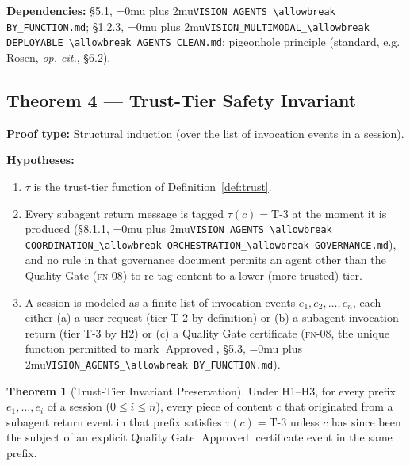 \documentclass[12pt]{article}
\theoremstyle{definition}
\newtheorem{theorem}{Theorem}
\DeclareRobustCommand{\code}[1]{\begingroup\Urlmuskip=0mu plus 2mu\relax\nolinkurl{#1}\endgroup}
\newcommand{\FN}[1]{\textsc{fn-#1}}
\DeclareMathOperator{\Approved}{Approved}
\newcommand{\VisionClean}{\code{VISION\_MULTIMODAL\_\allowbreak DEPLOYABLE\_\allowbreak AGENTS\_CLEAN.md}}
\newcommand{\VisionGov}{\code{VISION\_AGENTS\_\allowbreak COORDINATION\_\allowbreak ORCHESTRATION\_\allowbreak GOVERNANCE.md}}
\newcommand{\VisionFunc}{\code{VISION\_AGENTS\_\allowbreak BY\_FUNCTION.md}}
\begin{document}
\begin{sloppypar}
\textbf{Dependencies:} \S5.1, \VisionFunc{};
\S1.2.3, \VisionClean{}; pigeonhole
principle (standard, e.g. Rosen, \emph{op. cit.}, \S6.2).
\end{sloppypar}

\subsection{Theorem 4 --- Trust-Tier Safety Invariant}

\textbf{Proof type:} Structural induction (over the list of invocation
events in a session).

\textbf{Hypotheses:}
\begin{enumerate}
    \item[H1] $\tau$ is the trust-tier function of
              Definition~\ref{def:trust}.
    \item[H2] Every subagent return message is tagged $\tau(c) =
              \mathrm{T\text{-}3}$ at the moment it is produced (\S8.1.1,
              \VisionGov{}), and no rule in that governance
              document permits an agent other than the Quality Gate
              (\FN{08}) to re-tag content to a lower (more trusted) tier.
    \item[H3] A session is modeled as a finite list of invocation events
              $e_1, e_2, \ldots, e_n$, each either (a) a user request
              (tier T-2 by definition) or (b) a subagent invocation return
              (tier T-3 by H2) or (c) a Quality Gate certificate
              (\FN{08}, the unique function permitted to mark
              $\Approved$, \S5.3, \VisionFunc{}).
\end{enumerate}

\begin{theorem}[Trust-Tier Invariant Preservation]
\label{thm:trust}
Under H1--H3, for every prefix $e_1,\ldots,e_i$ of a session
($0 \leq i \leq n$), every piece of content $c$ that originated from a
subagent return event in that prefix satisfies $\tau(c) = \mathrm{T\text{-}3}$
unless $c$ has since been the subject of an explicit Quality Gate
$\Approved$ certificate event in the same prefix.
\end{theorem}
\end{document}
